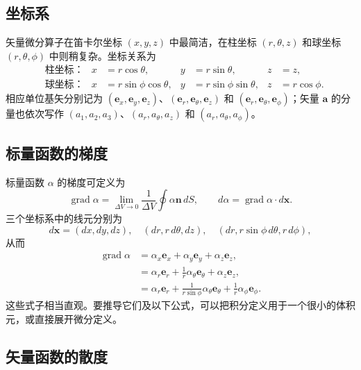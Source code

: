 \documentclass[11pt,a4paper,openany,fontset=none]{ctexbook}
\begin{document}
\subsection{坐标系}

矢量微分算子在笛卡尔坐标 $(x,y,z)$ 中最简洁，在柱坐标 $(r,\theta,z)$ 和球坐标 $(r,\theta,\phi)$ 中则稍复杂。坐标关系为
\begin{align}
 &\text{柱坐标：}&x&=r\cos\theta,&y&=r\sin\theta,&z&=z, \tag{1.5.1--3}\\
 &\text{球坐标：}&x&=r\sin\phi\cos\theta,&y&=r\sin\phi\sin\theta,&z&=r\cos\phi. \tag{1.5.4--6}
\end{align}
相应单位基矢分别记为 $(\bm e_x,\bm e_y,\bm e_z)$、$(\bm e_r,\bm e_\theta,\bm e_z)$ 和 $(\bm e_r,\bm e_\theta,\bm e_\phi)$；矢量 $\bm a$ 的分量也依次写作 $(a_1,a_2,a_3)$、$(a_r,a_\theta,a_z)$ 和 $(a_r,a_\theta,a_\phi)$。

\subsection{标量函数的梯度}

标量函数 $\alpha$ 的梯度可定义为
\begin{equation}
 \operatorname{grad}\alpha=\lim_{\Delta V\to0}\frac1{\Delta V}\oint\alpha\bm n\,dS,
 \qquad d\alpha=\operatorname{grad}\alpha\cdot d\bm x. \tag{1.5.13--14}
\end{equation}
三个坐标系中的线元分别为
\begin{equation}
 d\bm x=(dx,dy,dz),\quad (dr,r\,d\theta,dz),\quad
 (dr,r\sin\phi\,d\theta,r\,d\phi), \tag{1.5.15--17}
\end{equation}
从而
\begin{align}
 \operatorname{grad}\alpha&=\alpha_x\bm e_x+\alpha_y\bm e_y+\alpha_z\bm e_z, \tag{1.5.18}\\
 &=\alpha_r\bm e_r+\frac1r\alpha_\theta\bm e_\theta+\alpha_z\bm e_z, \tag{1.5.19}\\
 &=\alpha_r\bm e_r+\frac1{r\sin\phi}\alpha_\theta\bm e_\theta+\frac1r\alpha_\phi\bm e_\phi. \tag{1.5.20}
\end{align}
这些式子相当直观。要推导它们及以下公式，可以把积分定义用于一个很小的体积元，或直接展开微分定义。

\subsection{矢量函数的散度}
\end{document}
